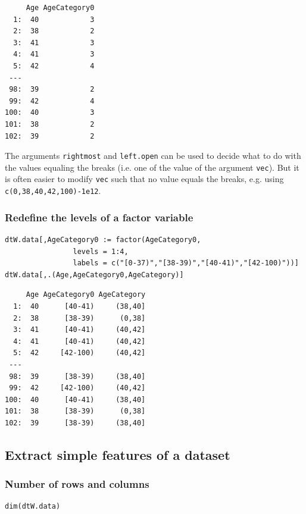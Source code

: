 \documentclass{article}
\begin{document}
\begin{verbatim}
     Age AgeCategory0
  1:  40            3
  2:  38            2
  3:  41            3
  4:  41            3
  5:  42            4
 ---                 
 98:  39            2
 99:  42            4
100:  40            3
101:  38            2
102:  39            2
\end{verbatim}

The arguments \texttt{rightmost} and \texttt{left.open} can be used to decide what
to do with the values equaling the breaks (i.e. one of the value of
the argument \texttt{vec}). But it is often easier to modify \texttt{vec} such that no value
equals the breaks, e.g. using \texttt{c(0,38,40,42,100)-1e12}.

\subsubsection{Redefine the levels of a factor variable}
\label{sec:org392e414}

\lstset{language=r,label= ,caption= ,captionpos=b,numbers=none}
\begin{lstlisting}
dtW.data[,AgeCategory0 := factor(AgeCategory0, 
				levels = 1:4, 
				labels = c("[0-37)","[38-39)","[40-41)","[42-100)"))]
dtW.data[,.(Age,AgeCategory0,AgeCategory)]
\end{lstlisting}

\begin{verbatim}
     Age AgeCategory0 AgeCategory
  1:  40      [40-41)     (38,40]
  2:  38      [38-39)      (0,38]
  3:  41      [40-41)     (40,42]
  4:  41      [40-41)     (40,42]
  5:  42     [42-100)     (40,42]
 ---                             
 98:  39      [38-39)     (38,40]
 99:  42     [42-100)     (40,42]
100:  40      [40-41)     (38,40]
101:  38      [38-39)      (0,38]
102:  39      [38-39)     (38,40]
\end{verbatim}

\subsection{Extract simple features of a dataset}
\label{sec:org37c8447}
\subsubsection{Number of rows and columns}
\label{sec:org880872b}
\lstset{language=r,label= ,caption= ,captionpos=b,numbers=none}
\begin{lstlisting}
dim(dtW.data)
\end{lstlisting}
\end{document}
